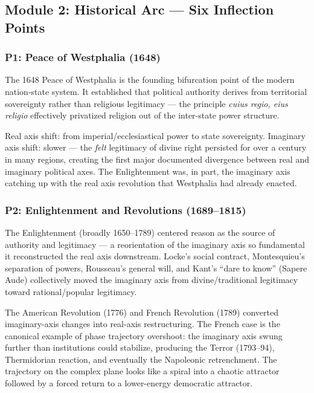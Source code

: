 \documentclass[11pt,letterpaper]{article}
\begin{document}
\subsection{Module 2: Historical Arc --- Six Inflection Points}

\subsubsection{P1: Peace of Westphalia (1648)}

The 1648 Peace of Westphalia is the founding bifurcation point of the modern nation-state system. It established that political authority derives from territorial sovereignty rather than religious legitimacy --- the principle \textit{cuius regio, eius religio} effectively privatized religion out of the inter-state power structure.

Real axis shift: from imperial/ecclesiastical power to state sovereignty. Imaginary axis shift: slower --- the \textit{felt} legitimacy of divine right persisted for over a century in many regions, creating the first major documented divergence between real and imaginary political axes. The Enlightenment was, in part, the imaginary axis catching up with the real axis revolution that Westphalia had already enacted.

\subsubsection{P2: Enlightenment and Revolutions (1689--1815)}

The Enlightenment (broadly 1650--1789) centered reason as the source of authority and legitimacy --- a reorientation of the imaginary axis so fundamental it reconstructed the real axis downstream. Locke's social contract, Montesquieu's separation of powers, Rousseau's general will, and Kant's ``dare to know'' (Sapere Aude) collectively moved the imaginary axis from divine/traditional legitimacy toward rational/popular legitimacy.

The American Revolution (1776) and French Revolution (1789) converted imaginary-axis changes into real-axis restructuring. The French case is the canonical example of phase trajectory overshoot: the imaginary axis swung further than institutions could stabilize, producing the Terror (1793--94), Thermidorian reaction, and eventually the Napoleonic retrenchment. The trajectory on the complex plane looks like a spiral into a chaotic attractor followed by a forced return to a lower-energy democratic attractor.
\end{document}
